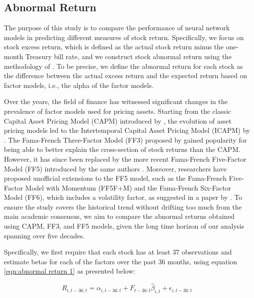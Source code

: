 \subsection{Abnormal Return}

The purpose of this study is to compare the performance of neural network models in predicting different measures of stock return. Specifically, we focus on stock excess return, which is defined as the actual stock return minus the one-month Treasury bill rate, and we construct stock abnormal return using the methodology of \citet*{kaniel2022machine}. To be precise, we define the abnormal return for each stock as the difference between the actual excess return and the expected return based on factor models, i.e., the alpha of the factor models.

Over the years, the field of finance has witnessed significant changes in the prevalence of factor models used for pricing assets. Starting from the classic Capital Asset Pricing Model (CAPM) introduced by \citet*{sharpe1964capital}, the evolution of asset pricing models led to the Intertemporal Capital Asset Pricing Model (ICAPM) by \citet*{merton1973intertemporal}. The Fama-French Three-Factor Model (FF3) proposed by \citet*{fama1992cross} gained popularity for being able to better explain the cross-section of stock returns than the CAPM. However, it has since been replaced by the more recent Fama-French Five-Factor Model (FF5) introduced by the same authors \citet*{fama2015five}. Moreover, researchers have proposed unofficial extensions to the FF5 model, such as the Fama-French Five-Factor Model with Momentum (FF5F+M) and the Fama-French Six-Factor Model (FF6), which includes a volatility factor, as suggested in a paper by \citet*{harvey2016and}. To ensure the study covers the historical trend without drifting too much from the main academic consensus, we aim to compare the abnormal returns obtained using CAPM, FF3, and FF5 models, given the long time horizon of our analysis spanning over five decades.

Specifically, we first require that each stock has at least 37 observations and estimate betas for each of the factors over the past 36 months, using equation \ref{eqn:abnormal return 1} as presented below:

\begin{equation}
  \label{eqn:abnormal return 1}
  R_{i,t-36:t} = \alpha_{i,t-36:t} + F_{t-36:t} \hat{\beta}_{i,t} + \epsilon_{i, t-36:t}
\end{equation}

